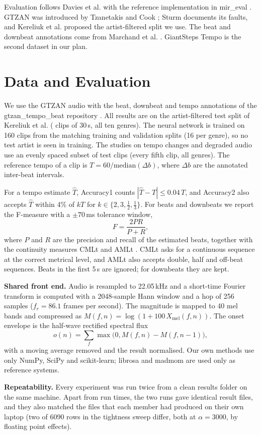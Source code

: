 Evaluation follows Davies et al. \cite{daviseval} with the reference implementation in mir\_eval \cite{mireval}. GTZAN was introduced by Tzanetakis and Cook \cite{gtzan}; Sturm \cite{sturm} documents its faults, and Kereliuk et al. \cite{kereliuk} proposed the artist-filtered split we use. The beat and downbeat annotations come from Marchand et al. \cite{marchand}. GiantSteps Tempo \cite{giantsteps} is the second dataset in our plan.

\section{Data and Evaluation}

We use the GTZAN audio with the beat, downbeat and tempo annotations of the gtzan\_tempo\_beat repository \cite{tutorial, marchand}. All results are on the artist-filtered test split of Kereliuk et al. \cite{kereliuk} (\NTempo{} clips of 30\,s, all ten genres). The neural network is trained on 160 clips from the matching training and validation splits (16 per genre), so no test artist is seen in training. The studies on tempo changes and degraded audio use an evenly spaced subset of \NDeg{} test clips (every fifth clip, all genres). The reference tempo of a clip is $T = 60/\mathrm{median}(\Delta b)$, where $\Delta b$ are the annotated inter-beat intervals.

For a tempo estimate $\hat{T}$, Accuracy1 counts $|\hat{T}-T| \le 0.04\,T$, and Accuracy2 also accepts $\hat{T}$ within 4\% of $kT$ for $k \in \{2, 3, \tfrac{1}{2}, \tfrac{1}{3}\}$. For beats and downbeats we report the F-measure with a $\pm 70$\,ms tolerance window,
\begin{equation}
F = \frac{2PR}{P+R},
\end{equation}
where $P$ and $R$ are the precision and recall of the estimated beats, together with the continuity measures CMLt and AMLt \cite{daviseval}. CMLt asks for a continuous sequence at the correct metrical level, and AMLt also accepts double, half and off-beat sequences. Beats in the first 5\,s are ignored; for downbeats they are kept.

\textbf{Shared front end.} Audio is resampled to 22.05\,kHz and a short-time Fourier transform is computed with a 2048-sample Hann window and a hop of 256 samples ($f_r = 86.1$ frames per second). The magnitude is mapped to 40 mel bands and compressed as $M(f,n) = \log(1 + 100\,X_{\mathrm{mel}}(f,n))$. The onset envelope is the half-wave rectified spectral flux
\begin{equation}
o(n) = \sum_f \max\big(0, M(f,n) - M(f,n-1)\big),
\end{equation}
with a moving average removed and the result normalised. Our own methods use only NumPy, SciPy and scikit-learn; librosa \cite{librosa} and madmom \cite{madmom} are used only as reference systems.

\textbf{Repeatability.} Every experiment was run twice from a clean results folder on the same machine. Apart from run times, the two runs gave identical result files, and they also matched the files that each member had produced on their own laptop (two of 6090 rows in the tightness sweep differ, both at $\alpha = 3000$, by floating point effects).

